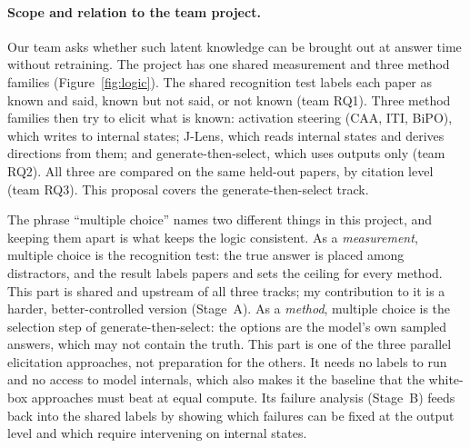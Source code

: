 \documentclass[sigconf,nonacm]{acmart}
\begin{document}
\paragraph{Scope and relation to the team project.}
Our team asks whether such latent knowledge can be brought out at answer time without retraining. The project has one shared measurement and three method families (Figure~\ref{fig:logic}). The shared recognition test labels each paper as known and said, known but not said, or not known (team RQ1). Three method families then try to elicit what is known: activation steering (CAA, ITI, BiPO), which writes to internal states; J-Lens, which reads internal states and derives directions from them; and generate-then-select, which uses outputs only (team RQ2). All three are compared on the same held-out papers, by citation level (team RQ3). This proposal covers the generate-then-select track.

The phrase ``multiple choice'' names two different things in this project, and keeping them apart is what keeps the logic consistent. As a \emph{measurement}, multiple choice is the recognition test: the true answer is placed among distractors, and the result labels papers and sets the ceiling for every method. This part is shared and upstream of all three tracks; my contribution to it is a harder, better-controlled version (Stage~A). As a \emph{method}, multiple choice is the selection step of generate-then-select: the options are the model's own sampled answers, which may not contain the truth. This part is one of the three parallel elicitation approaches, not preparation for the others. It needs no labels to run and no access to model internals, which also makes it the baseline that the white-box approaches must beat at equal compute. Its failure analysis (Stage~B) feeds back into the shared labels by showing which failures can be fixed at the output level and which require intervening on internal states.
\end{document}
